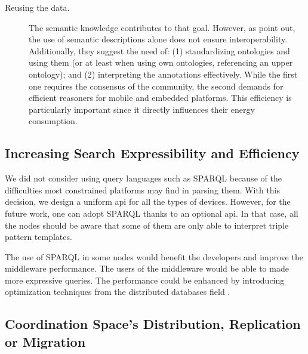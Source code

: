 \begin{description}
  \item[Reusing the data.] The semantic knowledge contributes to that goal.
			  However, as \citet{barnaghi_semantics_2012} point out, the use of semantic descriptions alone does not ensure interoperability.
			  Additionally, they suggest the need of:
			  (1) standardizing ontologies and using them (or at least when using own ontologies, referencing an upper ontology); and
			  (2) interpreting the annotations effectively. %
			  While the first one requires the consensus of the community, the second demands for efficient reasoners for mobile and embedded platforms.
			  This efficiency is particularly important since it directly influences their energy consumption.
			  
\end{description}


\subsection{Increasing Search Expressibility and Efficiency}

We did not consider using query languages such as SPARQL because of the difficulties most constrained platforms may find in parsing them.
With this decision, we design a uniform \ac{api} for all the types of devices.
However, for the future work, one can adopt SPARQL thanks to an optional \ac{api}.
In that case, all the nodes should be aware that some of them are only able to interpret triple pattern templates.

The use of SPARQL in some nodes would benefit the developers and improve the middleware performance. %
The users of the middleware would be able to made more expressive queries.
The performance could be enhanced by introducing optimization techniques from the distributed databases field \cite{schwarte_fedx_optimization_2011}. %


\subsection{Coordination Space's Distribution, Replication or Migration} %

